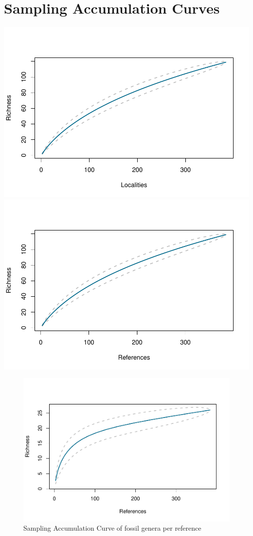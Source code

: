 \documentclass[]{article}
\begin{document}
\newpage

\section{Sampling Accumulation
Curves}\label{sampling-accumulation-curves}

\includegraphics{MA_JJ_files/figure-latex/SACSpecies-1.pdf}
\includegraphics{MA_JJ_files/figure-latex/SACSpecies-2.pdf}

\begin{figure}[htbp]
\centering
\includegraphics{MA_JJ_files/figure-latex/SACGenera-1.pdf}
\caption{Sampling Accumulation Curve of fossil genera per reference}
\end{figure}
\end{document}
